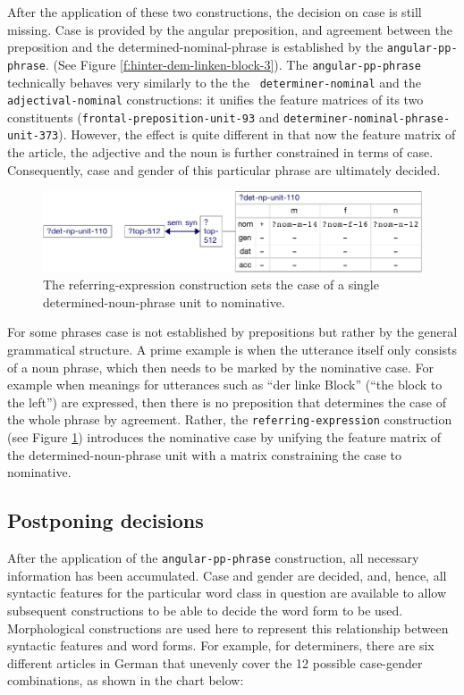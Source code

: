 After the application of these two constructions, the decision on case
is still missing. Case is provided by the angular preposition, and
agreement between the preposition and the determined-nominal-phrase is
established by the {\footnotesize\tt angular-pp-phrase}. (See Figure
\ref{f:hinter-dem-linken-block-3}). The {\footnotesize\tt angular-pp-phrase}
technically behaves very similarly to the the {\footnotesize\tt
  determiner-nominal} and the {\footnotesize\tt adjectival-nominal}
constructions: it unifies the feature matrices of its two constituents
({\footnotesize\texttt{frontal-preposition-unit-93}} and
{\footnotesize\texttt{determiner-nominal-phrase-unit-373}}).  However, the effect is
quite different in that now the feature matrix of the article, the
adjective and the noun is further constrained in terms of
case. Consequently, case and gender of this particular phrase are
ultimately decided.


\begin{figure}[t]
  \centerline{\includegraphics[scale=0.65]{figs/referring-expression-fvm}}
  \caption[Handling case in single determined-noun-phrases]{
  The referring-expression construction sets the case of a
    single determined-noun-phrase unit to nominative.}
  \label{f:referring-expression-fvm}
\end{figure}

For some phrases case is not established by prepositions but
rather by the general grammatical structure. A prime example is when 
the utterance itself only consists of a noun phrase, which then needs to be marked by 
the nominative case. For example when meanings for utterances such as ``der
linke Block'' (``the block to the left'') are expressed, then there
is no preposition that determines the case of the whole
phrase by agreement. Rather, the {\footnotesize\texttt{referring-expression}}
construction (see Figure \ref{f:referring-expression-fvm})
introduces the nominative case by unifying the feature matrix of the
determined-noun-phrase unit with a matrix constraining the case to
nominative.


\subsection*{Postponing decisions}
After the application of the {\footnotesize\tt angular-pp-phrase}
construction, all necessary information has been accumulated. Case and
gender are decided, and, hence, all syntactic features for the
particular word class in question are available to allow subsequent
constructions to be able to decide the word form to be used. Morphological
constructions are used here to represent this relationship between syntactic
features and word forms. For example, for determiners, there
are six different articles in German that unevenly cover the 12
possible case-gender combinations, as shown in the chart below:

